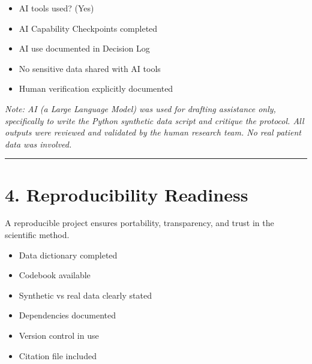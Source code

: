 \documentclass[
]{report}
\providecommand{\tightlist}{%
  \setlength{\itemsep}{0pt}\setlength{\parskip}{0pt}}
\begin{document}
\begin{itemize}
\tightlist
\item[$\boxtimes$]
  AI tools used? (Yes)
\item[$\boxtimes$]
  AI Capability Checkpoints completed
\item[$\boxtimes$]
  AI use documented in Decision Log
\item[$\boxtimes$]
  No sensitive data shared with AI tools
\item[$\boxtimes$]
  Human verification explicitly documented
\end{itemize}

\emph{Note: AI (a Large Language Model) was used for drafting assistance
only, specifically to write the Python synthetic data script and
critique the protocol. All outputs were reviewed and validated by the
human research team. No real patient data was involved.}

\begin{center}\rule{0.5\linewidth}{0.5pt}\end{center}

\chapter{4. Reproducibility Readiness}\label{reproducibility-readiness}

\begin{tcolorbox}[enhanced jigsaw, opacitybacktitle=0.6, coltitle=black, colback=white, opacityback=0, leftrule=.75mm, colbacktitle=quarto-callout-note-color!10!white, colframe=quarto-callout-note-color-frame, left=2mm, toprule=.15mm, breakable, titlerule=0mm, bottomtitle=1mm, rightrule=.15mm, bottomrule=.15mm, title=\textcolor{quarto-callout-note-color}{\faInfo}\hspace{0.5em}{Note}, toptitle=1mm, arc=.35mm]

A reproducible project ensures portability, transparency, and trust in
the scientific method.

\end{tcolorbox}

\begin{itemize}
\tightlist
\item[$\boxtimes$]
  Data dictionary completed
\item[$\boxtimes$]
  Codebook available
\item[$\boxtimes$]
  Synthetic vs real data clearly stated
\item[$\boxtimes$]
  Dependencies documented
\item[$\boxtimes$]
  Version control in use
\item[$\boxtimes$]
  Citation file included
\end{itemize}
\end{document}
